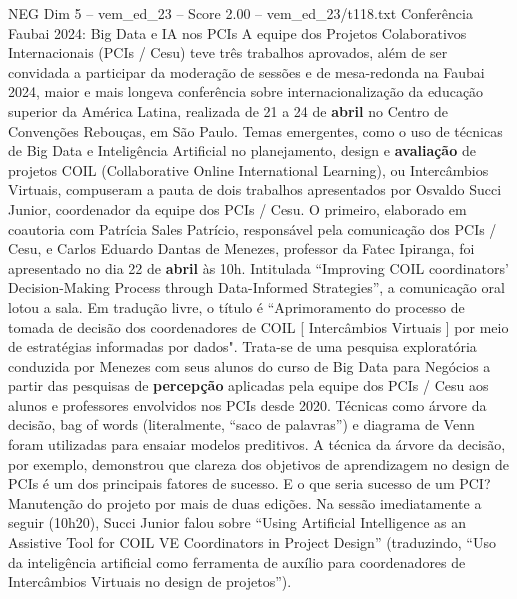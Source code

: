 \begin{textsample}{NEG Dim 5 – vem\_ed\_23 – Score 2.00 – vem\_ed\_23/t118.txt}  \label{ex:f5_neg_107}
Conferência Faubai 2024: Big Data e IA nos PCIs A equipe dos Projetos Colaborativos Internacionais (PCIs / Cesu) teve três trabalhos aprovados, além de ser convidada a participar da moderação de sessões e de mesa-redonda na Faubai 2024, maior e mais longeva conferência sobre internacionalização da educação superior da América Latina, realizada de 21 a 24 de \textbf{abril} no Centro de Convenções Rebouças, em São Paulo.
Temas emergentes, como o uso de técnicas de Big Data e Inteligência Artificial no planejamento, design e \textbf{avaliação} de projetos COIL (Collaborative Online International Learning), ou Intercâmbios Virtuais, compuseram a pauta de dois trabalhos apresentados por Osvaldo Succi Junior, coordenador da equipe dos PCIs / Cesu.
O primeiro, elaborado em coautoria com Patrícia Sales Patrício, responsável pela comunicação dos PCIs / Cesu, e Carlos Eduardo Dantas de Menezes, professor da Fatec Ipiranga, foi apresentado no dia 22 de \textbf{abril} às 10h.
Intitulada “Improving COIL coordinators’ Decision-Making Process through Data-Informed Strategies”, a comunicação oral lotou a sala.
Em tradução livre, o título é “Aprimoramento do processo de tomada de decisão dos coordenadores de COIL [ Intercâmbios Virtuais ] por meio de estratégias informadas por dados".
Trata-se de uma pesquisa exploratória conduzida por Menezes com seus alunos do curso de Big Data para Negócios a partir das pesquisas de \textbf{percepção} aplicadas pela equipe dos PCIs / Cesu aos alunos e professores envolvidos nos PCIs desde 2020.
Técnicas como árvore da decisão, bag of words (literalmente, “saco de palavras”) e diagrama de Venn foram utilizadas para ensaiar modelos preditivos.
A técnica da árvore da decisão, por exemplo, demonstrou que clareza dos objetivos de aprendizagem no design de PCIs é um dos principais fatores de sucesso.
E o que seria sucesso de um PCI?
Manutenção do projeto por mais de duas edições.
Na sessão imediatamente a seguir (10h20), Succi Junior falou sobre “Using Artificial Intelligence as an Assistive Tool for COIL VE Coordinators in Project Design” (traduzindo, “Uso da inteligência artificial como ferramenta de auxílio para coordenadores de Intercâmbios Virtuais no design de projetos”).

\end{textsample}
